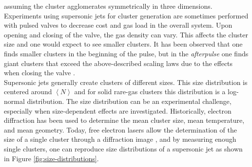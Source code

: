 assuming the cluster agglomerates symmetrically in three dimensions.\\[1\baselineskip]
%
Experiments using supersonic jets for cluster generation are sometimes performed with pulsed valves to decrease cost and gas load in the overall system. Upon opening and closing of the valve, the gas density can vary. This affects the cluster size and one would expect to see smaller clusters. It has been observed that one finds smaller clusters in the beginning of the pulse, but in the \textit{afterpulse} one finds giant clusters that exceed the above-described scaling laws due to the effects when closing the valve \citep{Rupp-2014-JCP}.\\[1\baselineskip]
%
Supersonic jets generally create clusters of different sizes. This size distribution is centered around $\left\langle N\right\rangle$ and for solid rare-gas clusters this distribution is a log-normal distribution. The size distribution can be an experimental challenge, especially when size-dependent effects are investigated. Historically, electron diffraction \citep{Farges-1981-SurfSci,Bartell-1986-ChemRev} has been used to determine the mean cluster size, mean temperature, and mean geometry. Today, free electron lasers allow the determination of the size of a single cluster through a diffraction image \citep{Rupp-2012-NJP}, and by measuring enough single clusters, one can reproduce size distributions of a supersonic jet as shown in Figure \ref{fig:size-distributions}.
%
%
%
%
%
%
